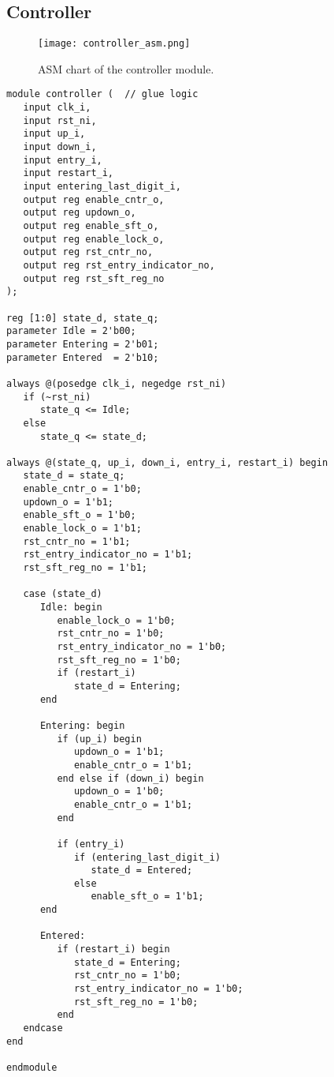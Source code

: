\subsection{Controller}

\begin{figure}[htbp]
   \centering
   \texttt{[image: controller\_asm.png]}
   \caption{ASM chart of the controller module.}
   \label{fig:controller_asm}
\end{figure}

\begin{verbatim}
module controller (  // glue logic
   input clk_i,
   input rst_ni,
   input up_i,
   input down_i,
   input entry_i,
   input restart_i,
   input entering_last_digit_i,
   output reg enable_cntr_o,
   output reg updown_o,
   output reg enable_sft_o,
   output reg enable_lock_o,
   output reg rst_cntr_no,
   output reg rst_entry_indicator_no,
   output reg rst_sft_reg_no
);

reg [1:0] state_d, state_q;
parameter Idle = 2'b00;
parameter Entering = 2'b01;
parameter Entered  = 2'b10;

always @(posedge clk_i, negedge rst_ni)
   if (~rst_ni)
      state_q <= Idle;
   else
      state_q <= state_d;

always @(state_q, up_i, down_i, entry_i, restart_i) begin
   state_d = state_q;
   enable_cntr_o = 1'b0;
   updown_o = 1'b1;
   enable_sft_o = 1'b0;
   enable_lock_o = 1'b1;
   rst_cntr_no = 1'b1;
   rst_entry_indicator_no = 1'b1;
   rst_sft_reg_no = 1'b1;

   case (state_d)
      Idle: begin
         enable_lock_o = 1'b0;
         rst_cntr_no = 1'b0;
         rst_entry_indicator_no = 1'b0;
         rst_sft_reg_no = 1'b0;
         if (restart_i)
            state_d = Entering;
      end

      Entering: begin
         if (up_i) begin
            updown_o = 1'b1;
            enable_cntr_o = 1'b1;
         end else if (down_i) begin
            updown_o = 1'b0;
            enable_cntr_o = 1'b1;
         end

         if (entry_i)
            if (entering_last_digit_i)
               state_d = Entered;
            else
               enable_sft_o = 1'b1;
      end

      Entered:
         if (restart_i) begin
            state_d = Entering;
            rst_cntr_no = 1'b0;
            rst_entry_indicator_no = 1'b0;
            rst_sft_reg_no = 1'b0;
         end
   endcase
end

endmodule
\end{verbatim}

